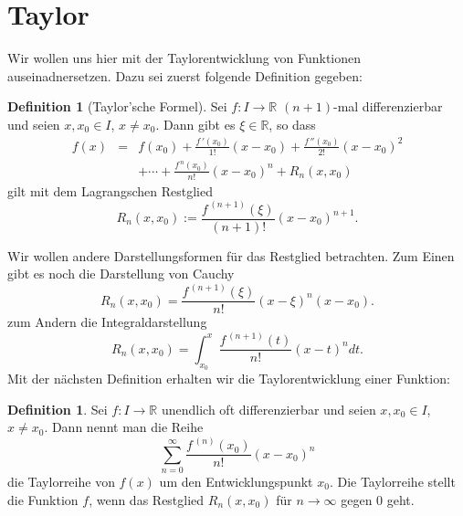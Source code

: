 \documentclass[fontsize=12pt,paper=a4,twoside,bibtotoc,idxtotoc,
liststotoc,pagesize,BCOR1.2cm,DIV15,chapterprefix,pagesize=pdftex]{scrbook}
\theoremstyle{plain}
\theoremstyle{definition}
\newtheorem{df}[equation]{Definition}
\theoremstyle{remark}
\begin{document}
\section{Taylor}
Wir wollen uns hier mit der Taylorentwicklung von Funktionen auseinadnersetzen. Dazu sei zuerst folgende Definition gegeben:
\begin{df}[Taylor'sche Formel]
Sei $f:I \rightarrow \mathbb{R}$ $(n+1)$-mal differenzierbar und seien
$x,x_0 \in I$, $x \neq x_0$. Dann gibt es $\xi \in \mathbb{R}$, so
dass
\begin{eqnarray*}
f(x)& = & f(x_0) + \frac{f\,'(x_0)}{1!}(x-x_0)+
\frac{f\,''(x_0)}{2!}(x-x_0)^2\\[0.5cm]
 & & + \cdots + \frac{f^{\,n}(x_0)}{n!}(x-x_0)^n +R_n(x,x_0) 
\end{eqnarray*}
gilt mit dem Lagrangschen Restglied
\[ R_n(x,x_0) := \frac{f^{\,(n+1)}(\xi)}{(n+1)!} (x-x_0)^{n+1}. \]
\end{df}
Wir wollen andere Darstellungsformen für das Restglied betrachten.
Zum Einen gibt es noch die Darstellung von Cauchy
\[ R_n(x,x_0)= \frac{f^{\,(n+1)}(\xi)}{n!} (x- \xi)^{n}(x-x_0).\]
zum Andern die Integraldarstellung
\[ R_n(x,x_0)= \int_{x_0}^x \frac{f^{\,(n+1)}(t)}{n!}  (x-t)^n dt.\]
Mit der nächsten Definition erhalten wir die Taylorentwicklung einer Funktion:
\begin{df}
Sei $f:I \rightarrow \mathbb{R}$ unendlich oft  differenzierbar und seien
$x,x_0 \in I$, $x \neq x_0$. Dann nennt man die Reihe
\[ \sum_{n=0}^\infty \frac{f^{\,(n)}(x_0)}{n!}(x-x_0)^n \]
die Taylorreihe von $f(x)$ um den Entwicklungspunkt $x_0$.
\bigskip
Die Taylorreihe stellt die Funktion $f$, wenn das Restglied $R_n(x,x_0)$ für $n
\rightarrow \infty$ gegen $0$ geht.
\end{df}
\end{document}
